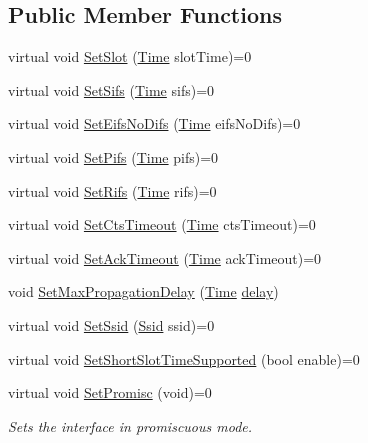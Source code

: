 \subsection*{Public Member Functions}
\begin{DoxyCompactItemize}
\item 
virtual void \hyperlink{classns3_1_1WifiMac_aa893e7f687659bc0e00ac00acf06a40f}{Set\+Slot} (\hyperlink{classns3_1_1Time}{Time} slot\+Time)=0
\item 
virtual void \hyperlink{classns3_1_1WifiMac_af537fb3227ff6a886c00cebfe2674807}{Set\+Sifs} (\hyperlink{classns3_1_1Time}{Time} sifs)=0
\item 
virtual void \hyperlink{classns3_1_1WifiMac_aa899e0f0a0b3316b4a66876643fe87f5}{Set\+Eifs\+No\+Difs} (\hyperlink{classns3_1_1Time}{Time} eifs\+No\+Difs)=0
\item 
virtual void \hyperlink{classns3_1_1WifiMac_a5be0d3689d1669b637bbe0fed2a7e287}{Set\+Pifs} (\hyperlink{classns3_1_1Time}{Time} pifs)=0
\item 
virtual void \hyperlink{classns3_1_1WifiMac_a1aecc5dc30142884e09a80c9e708c56c}{Set\+Rifs} (\hyperlink{classns3_1_1Time}{Time} rifs)=0
\item 
virtual void \hyperlink{classns3_1_1WifiMac_af803f882030d1b367407af43f82d8c13}{Set\+Cts\+Timeout} (\hyperlink{classns3_1_1Time}{Time} cts\+Timeout)=0
\item 
virtual void \hyperlink{classns3_1_1WifiMac_a42c8acb7dec6b7f9d01d568fd21f2e3e}{Set\+Ack\+Timeout} (\hyperlink{classns3_1_1Time}{Time} ack\+Timeout)=0
\item 
void \hyperlink{classns3_1_1WifiMac_a0dd41720796f3b8600a4f097ded8a266}{Set\+Max\+Propagation\+Delay} (\hyperlink{classns3_1_1Time}{Time} \hyperlink{mmwave_2model_2fading-traces_2fading__trace__generator_8m_a7964e6aa8f61a9d28973c8267a606ad8}{delay})
\item 
virtual void \hyperlink{classns3_1_1WifiMac_a27d55677dca1e04e0c5bfc27039b880e}{Set\+Ssid} (\hyperlink{classns3_1_1Ssid}{Ssid} ssid)=0
\item 
virtual void \hyperlink{classns3_1_1WifiMac_ab8c94a02c7bb54db4dcd1d4db80f161b}{Set\+Short\+Slot\+Time\+Supported} (bool enable)=0
\item 
virtual void \hyperlink{classns3_1_1WifiMac_ab835dc0425651a1a2f23710c575fea02}{Set\+Promisc} (void)=0
\begin{DoxyCompactList}\small\item\em Sets the interface in promiscuous mode. \end{DoxyCompactList}\item 

\end{DoxyCompactItemize}
